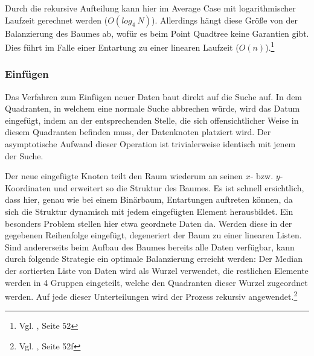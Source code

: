 \documentclass[%
			paper=a4,%
			DIV12,
			liststotoc,
			bibtotoc,
			draft=false,%
			titlepage
			]{scrartcl}
\newcommand{\zit}[3]{#1 \cite{#2}, #3}
\newcommand{\footzit}[3]{\footnote{\zit{#1}{#2}{#3}}}
\begin{document}
Durch die rekursive Aufteilung kann hier im Average Case mit logarithmischer Laufzeit gerechnet werden ($O(log_4\ N)$).
Allerdings hängt diese Größe von der Balanzierung des Baumes ab, wofür es beim Point Quadtree keine Garantien gibt. Dies führt im Falle einer Entartung zu einer linearen Laufzeit ($O(n)$).\footzit{Vgl.}{Samet90}{Seite 52}


\subsubsection{Einfügen}
\label{sec:pointquadtree:insert}
Das Verfahren zum Einfügen neuer Daten baut direkt auf die Suche auf.
In dem Quadranten, in welchem eine normale Suche abbrechen würde, wird das Datum eingefügt, indem an der entsprechenden Stelle, die sich offensichtlicher Weise in diesem Quadranten befinden muss, der Datenknoten platziert wird.
Der asymptotische Aufwand dieser Operation ist trivialerweise identisch mit jenem der Suche.

Der neue eingefügte Knoten teilt den Raum wiederum an seinen $x$- bzw. $y$-Koordinaten und erweitert so die Struktur des Baumes.  
Es ist schnell ersichtlich, dass hier, genau wie bei einem Binärbaum, Entartungen auftreten können, da sich die Struktur dynamisch mit jedem eingefügten Element herausbildet. 
Ein besonders Problem stellen hier etwa geordnete Daten da. Werden diese in der gegebenen Reihenfolge eingefügt, degeneriert der Baum zu einer linearen Listen. Sind andererseits beim Aufbau des Baumes bereits alle Daten verfügbar, kann durch folgende Strategie ein optimale Balanzierung erreicht werden: Der Median der sortierten Liste von Daten wird als Wurzel verwendet, die restlichen Elemente werden in 4 Gruppen eingeteilt, welche den Quadranten dieser Wurzel zugeordnet werden. Auf jede dieser Unterteilungen wird der Prozess rekursiv angewendet.\footzit{Vgl.}{Samet90}{Seite 52f}
\end{document}
